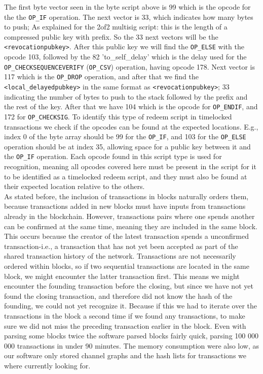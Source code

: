 The first byte vector seen in the byte script above is 99 which is the opcode for the the {\tt OP\_IF} operation. The next vector is 33, which indicates how many bytes to push; As explained for the 2of2 multisig script: this is the length of a compressed public key with prefix. So the 33 next vectors will be the {\tt <revocationpubkey>}. After this public key we will find the {\tt OP\_ELSE} with the opcode 103, followed by the 82 'to\_self\_delay' which is the delay used for the {\tt OP\_CHECKSEQUENCEVERIFY} ({\tt OP\_CSV}) operation, having opcode 178. 
Next vector is 117 which is the {\tt OP\_DROP} operation, and after that we find the {\tt <local\_delayedpubkey>} in the same format as {\tt <revocationpubkey>}; 33 indicating the number of bytes to push to the stack followed by the prefix and the rest of the key. After that we have 104 which is the opcode for {\tt OP\_ENDIF}, and 172 for {\tt OP\_CHECKSIG}.
To identify this type of redeem script in timelocked transactions we check if the opcodes can be found at the expected locations. E.g., index 0 of the byte array should be 99 for the {\tt OP\_IF}, and 103 for the {\tt OP\_ELSE} operation should be at index 35, allowing space for a public key between it and the {\tt OP\_IF} operation. Each opcode found in this script type is used for recognition, meaning all opcodes covered here must be present in the script for it to be identified as a timelocked redeem script, and they must also be found at their expected location relative to the others.
\\

As stated before, the inclusion of transactions in blocks naturally orders them, because transactions added in new blocks must have inputs from transactions already in the blockchain.
However, transactions pairs where one spends another can be confirmed at the same time, meaning they are included in the same block.
This occurs because the creator of the latest transaction spends a unconfirmed transaction-i.e., a transaction that has not yet been accepted as part of the shared transaction history of the network. 
Transactions are not necessarily ordered within blocks, so if two sequential transactions are located in the same block, we might encounter the latter transaction first.
This means we might encounter the founding transaction before the closing, but since we have not yet found the closing transaction, and therefore did not know the hash of the founding, we could not yet recognize it.
Because if this we had to iterate over the transactions in the block a second time if we found any transactions, to make sure we did not miss the preceding transaction earlier in the block.
Even with parsing some blocks twice the software parsed blocks fairly quick, parsing 100 000 000 transactions in under 90 minutes.
The memory consumption were also low, as our software only stored channel graphs and the hash lists for transactions we where currently looking for.

